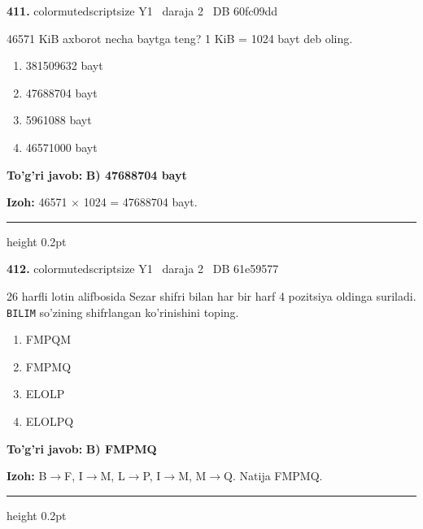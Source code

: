 \documentclass[10pt,a4paper,oneside]{article}
\begin{document}
\noindent\textbf{\color{ink}411.}  {color{muted}scriptsize Y1 \textbullet\ daraja 2 \textbullet\ DB 60fc09dd}
\par
46571 KiB axborot necha baytga teng? 1 KiB = 1024 bayt deb oling.
\begin{enumerate}[label=\Alph*),leftmargin=9mm]
\item 381509632 bayt
\item 47688704 bayt
\item 5961088 bayt
\item 46571000 bayt
\end{enumerate}
\begin{tcolorbox}[enhanced,breakable,colback=teal!4,colframe=teal!50!black,boxrule=0.5pt,arc=1.1mm,left=3mm,right=3mm,top=1.7mm,bottom=1.7mm,before skip=2mm,after skip=2mm]
\textbf{\color{teal}To'g'ri javob:} \textbf{B) 47688704 bayt}
\par\smallskip
\textbf{Izoh:} 46571 \ensuremath{\times} 1024 = 47688704 bayt.
\end{tcolorbox}
\vspace{2mm}\hrule height 0.2pt \vspace{3mm}

\noindent\textbf{\color{ink}412.}  {color{muted}scriptsize Y1 \textbullet\ daraja 2 \textbullet\ DB 61e59577}
\par
26 harfli lotin alifbosida Sezar shifri bilan har bir harf 4 pozitsiya oldinga suriladi. \texttt{BILIM} so'zining shifrlangan ko'rinishini toping.
\begin{enumerate}[label=\Alph*),leftmargin=9mm]
\item FMPQM
\item FMPMQ
\item ELOLP
\item ELOLPQ
\end{enumerate}
\begin{tcolorbox}[enhanced,breakable,colback=teal!4,colframe=teal!50!black,boxrule=0.5pt,arc=1.1mm,left=3mm,right=3mm,top=1.7mm,bottom=1.7mm,before skip=2mm,after skip=2mm]
\textbf{\color{teal}To'g'ri javob:} \textbf{B) FMPMQ}
\par\smallskip
\textbf{Izoh:} B\ensuremath{\to}F, I\ensuremath{\to}M, L\ensuremath{\to}P, I\ensuremath{\to}M, M\ensuremath{\to}Q. Natija FMPMQ.
\end{tcolorbox}
\vspace{2mm}\hrule height 0.2pt \vspace{3mm}
\end{document}
